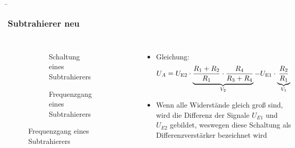 \begin{frame}
    \b{
    \frametitle{Subtrahierer neu}
    \begin{columns}
        \centering
        \begin{figure}
    \centering

    \begin{subfigure}{\linewidth}
        \centering
        \resizebox{0.6\linewidth}{!}{}
        \caption{Schaltung eines Subtrahierers}
    \end{subfigure}

    \vspace{0.5cm} 

    \begin{subfigure}{\linewidth}
        \centering
        \resizebox{0.6\linewidth}{!}{}
        \caption{Frequenzgang eines Subtrahierers}
    \end{subfigure}

\end{figure}

        \raggedleft
        \begin{itemize}
            \item Gleichung:
          \[
 {U_A} = {U_{{\textnormal{E2}}}} \cdot \underbrace{ \frac{R_1 + R_2}{R_1} \cdot \frac{R_4}{R_3 + R_4}}_{V_2} - U_{\textnormal{E1}} \cdot \underbrace{\frac{R_2}{R_1}}_{V_1}
          \]
    \item Wenn alle Widerstände gleich groß sind, wird die Differenz der Signale $U_{E1}$ und $U_{E2}$ gebildet, weswegen diese Schaltung als Differenzverstärker bezeichnet wird
        \end{itemize}
    \end{columns}
    }
\end{frame}



